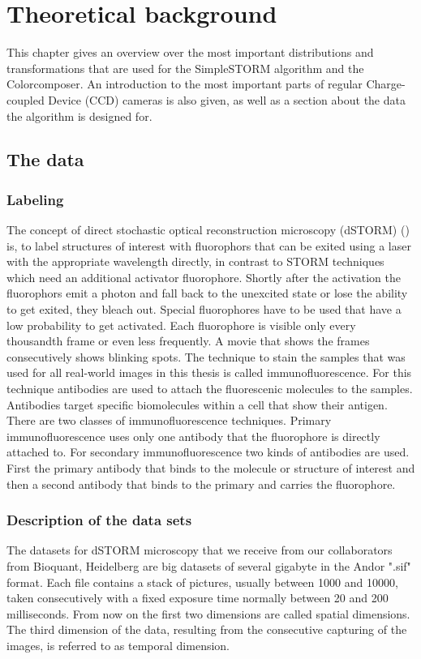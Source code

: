 \chapter{Theoretical background}
This chapter gives an overview over the most important distributions and transformations that are used for the SimpleSTORM algorithm and the Colorcomposer. An introduction to the most important parts of regular Charge-coupled Device (CCD) cameras is also given, as well as a section about the data the algorithm is designed for. 

\section{The data}
\subsection{Labeling}
The concept of direct stochastic optical reconstruction microscopy (dSTORM) (\cite{heilemann}) is, to label structures of interest with fluorophors that can be exited using a laser with the appropriate wavelength directly, in contrast to STORM techniques which need an additional activator fluorophore. Shortly after the activation the fluorophors emit a photon and fall back to the unexcited state or lose the ability to get exited, they bleach out. Special fluorophores have to be used that have a low probability to get activated. Each fluorophore is visible only every thousandth frame or even less frequently. A movie that shows the frames consecutively shows blinking spots.\newline
The technique to stain the samples that was used for all real-world images in this thesis is called immunofluorescence. For this technique antibodies are used to attach the fluorescenic molecules to the samples. Antibodies target specific biomolecules within a cell that show their antigen. There are two classes of immunofluorescence techniques.\newline
Primary immunofluorescence uses only one antibody that the fluorophore is directly attached to.\newline
For secondary immunofluorescence two kinds of antibodies are used. First the primary antibody that binds to the molecule or structure of interest and then a second antibody that binds to the primary and carries the fluorophore.

\subsection{Description of the data sets}
The datasets for dSTORM microscopy that we receive from our collaborators from
Bioquant, Heidelberg are big datasets of several gigabyte in the Andor ".sif" format. Each
file contains a stack of pictures, usually between 1000 and 10000, taken
consecutively with a fixed exposure time normally between 20 and 200 milliseconds. From now on the first two dimensions are called spatial dimensions. The third dimension of the data, resulting from the consecutive capturing of the images, is referred to as temporal dimension.\newline

